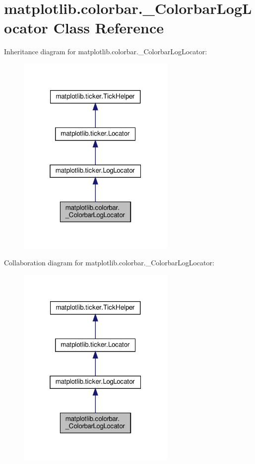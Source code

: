 \hypertarget{classmatplotlib_1_1colorbar_1_1__ColorbarLogLocator}{}\section{matplotlib.\+colorbar.\+\_\+\+Colorbar\+Log\+Locator Class Reference}
\label{classmatplotlib_1_1colorbar_1_1__ColorbarLogLocator}


Inheritance diagram for matplotlib.\+colorbar.\+\_\+\+Colorbar\+Log\+Locator\+:
\nopagebreak
\begin{figure}[H]
\begin{center}
\leavevmode
\includegraphics[width=217pt]{classmatplotlib_1_1colorbar_1_1__ColorbarLogLocator__inherit__graph}
\end{center}
\end{figure}


Collaboration diagram for matplotlib.\+colorbar.\+\_\+\+Colorbar\+Log\+Locator\+:
\nopagebreak
\begin{figure}[H]
\begin{center}
\leavevmode
\includegraphics[width=217pt]{classmatplotlib_1_1colorbar_1_1__ColorbarLogLocator__coll__graph}
\end{center}
\end{figure}
